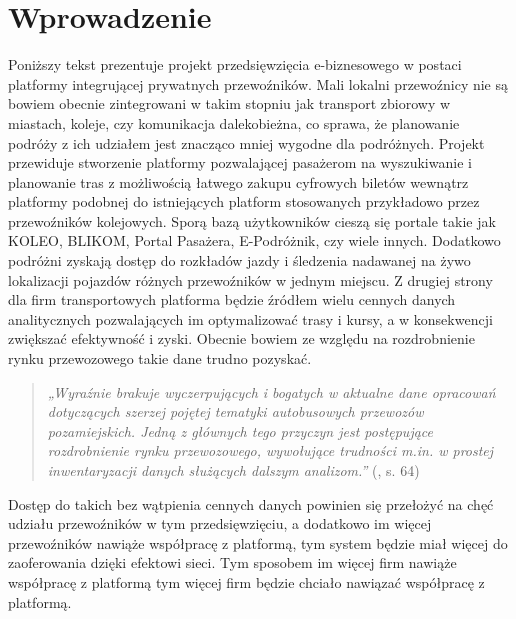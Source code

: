\chapter{Wprowadzenie}
\label{chap:pierwszy}


Poniższy tekst prezentuje projekt przedsięwzięcia e-biznesowego w postaci platformy integrującej prywatnych przewoźników. Mali lokalni przewoźnicy nie są bowiem obecnie zintegrowani w takim stopniu jak transport zbiorowy w miastach, koleje, czy komunikacja dalekobieżna, co sprawa, że planowanie podróży z ich udziałem jest znacząco mniej wygodne dla podróżnych. Projekt przewiduje stworzenie platformy pozwalającej pasażerom na wyszukiwanie i planowanie tras z możliwością łatwego zakupu cyfrowych biletów wewnątrz platformy podobnej do istniejących platform stosowanych przykładowo przez przewoźników kolejowych. Sporą bazą użytkowników cieszą się portale takie jak KOLEO, BLIKOM, Portal Pasażera, E-Podróżnik, czy wiele innych. \citep{Drewnowski_Małachowski_2018} Dodatkowo podróżni zyskają dostęp do rozkładów jazdy i śledzenia nadawanej na żywo lokalizacji pojazdów różnych przewoźników w jednym miejscu. Z drugiej strony dla firm transportowych platforma będzie źródłem wielu cennych danych analitycznych pozwalających im optymalizować trasy i kursy, a w konsekwencji zwiększać efektywność i zyski. Obecnie bowiem ze względu na rozdrobnienie rynku przewozowego takie dane trudno pozyskać.
\begin{quote}
    \textit{„Wyraźnie brakuje wyczerpujących i bogatych w aktualne dane opracowań dotyczących szerzej pojętej tematyki autobusowych przewozów pozamiejskich. Jedną z głównych tego przyczyn jest postępujące rozdrobnienie rynku przewozowego, wywołujące trudności m.in. w prostej inwentaryzacji danych służących dalszym analizom.”} (\citealt{Wolański_Mrozowski_Pieróg_2016}, s. 64)
\end{quote}
Dostęp do takich bez wątpienia cennych danych powinien się przełożyć na chęć udziału przewoźników w tym przedsięwzięciu, a dodatkowo im więcej przewoźników nawiąże współpracę z platformą, tym system będzie miał więcej do zaoferowania dzięki efektowi sieci. Tym sposobem im więcej firm nawiąże współpracę z platformą tym więcej firm będzie chciało nawiązać współpracę z platformą.

